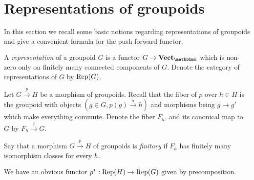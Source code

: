 \section{Representations of groupoids}
\label{GroupoidRep}
In this section we recall some basic notions regarding representations of groupoids and give a convenient formula for the push forward functor.

\begin{Definition}
A \emph{representation} of a groupoid $G$ is a functor $G\to \Vect_{\field}$ which is non-zero only on finitely many connected components of $G$. Denote the category of representations of $G$ by $\operatorname{Rep}(G)$.
\end{Definition}


Let $G\xrightarrow{p} H$ be a morphism of groupoids. Recall that the fiber of $p$ over $h\in H$ is the groupoid with objects $(g\in G, p(g)\xrightarrow{\sigma} h)$ and morphisms being $g\to g'$ which make everything commute. Denote the fiber $F_h$, and its canonical map to $G$ by $F_h\xrightarrow{i}G$. 

\begin{Definition}
Say that a morphism $G\xrightarrow{p} H$ of groupoids is \emph{finitary} if $F_h$ has finitely many isomorphism classes for every $h$. 
\end{Definition}

We have an obvious functor $p^*:\operatorname{Rep}(H)\to\operatorname{Rep}(G)$ given by precomposition.

